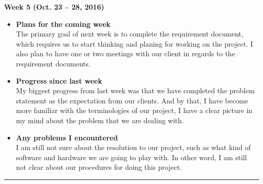 		\begin{center}
			\textbf{Week 5 (Oct. 23 {\textasciitilde{}} 28, 2016)}
		\end{center}
		\begin{itemize}
			\item \textbf{Plans for the coming week}
			\\The primary goal of next week is to complete the requirement document, which requires us to start thinking and planing for working on the project. I also plan to have one or two meetings with our client in regards to the requirement documents.\\

			\item \textbf{Progress since last week}
			\\My biggest progress from last week was that we have completed the problem statement as the expectation from our clients. And by that, I have become more familiar with the terminologies of our project, I have a clear picture in my mind about the problem that we are dealing with.\\

			\item \textbf{Any problems I encountered}
			\\I am still not sure about the resolution to our project, such as what kind of software and hardware we are going to play with. In other word, I am still not clear about our procedures for doing this project.\\
		\end{itemize}

		\rule{\textwidth}{0.5pt}

